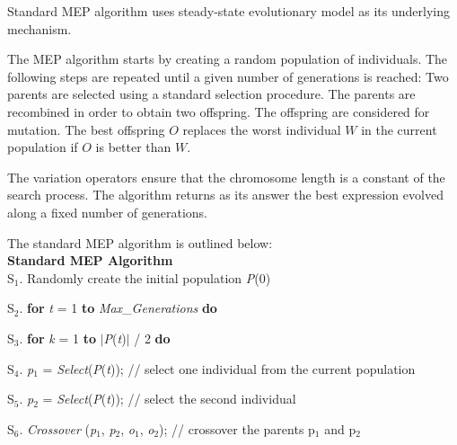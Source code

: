\documentclass [11pt]{article}
\begin{document}
Standard MEP algorithm uses steady-state evolutionary model \cite{syswerda1} as its underlying 
mechanism. 

The MEP algorithm starts by creating a random population of individuals. The 
following steps are repeated until a given number of generations is reached: 
Two parents are selected using a standard selection procedure. The parents 
are recombined in order to obtain two offspring. The offspring are 
considered for mutation. The best offspring $O$ replaces the worst individual 
$W$ in the current population if $O$ is better than $W$. 

The variation operators ensure that the chromosome length is a constant of 
the search process. The algorithm returns as its answer the best expression 
evolved along a fixed number of generations.

The standard MEP algorithm is outlined below:\\

\textbf{Standard MEP Algorithm}\\

\textsf{S}$_{1}$\textsf{. Randomly create the initial population 
}\textsf{\textit{P}}\textsf{(0)}

\textsf{S}$_{2}$\textsf{. }\textsf{\textbf{for}}\textsf{ 
}\textsf{\textit{t}}\textsf{ = 1 }\textsf{\textbf{to}}\textsf{ 
}\textsf{\textit{Max}}\textsf{{\_}}\textsf{\textit{Generations}}\textsf{ 
}\textsf{\textbf{do}}

\textsf{S}$_{3}$\textsf{. }\hspace{0.5cm}\textsf{\textbf{for}}\textsf{ 
}\textsf{\textit{k}}\textsf{ = 1 }\textsf{\textbf{to}}\textsf{ $\vert 
$}\textsf{\textit{P}}\textsf{(}\textsf{\textit{t}}\textsf{)$\vert $ / 2 
}\textsf{\textbf{do}}

\textsf{S}$_{4}$\textsf{. }\hspace{1cm}\textsf{\textit{p}}$_{1}$\textsf{ = 
}\textsf{\textit{Select}}\textsf{(}\textsf{\textit{P}}\textsf{(}\textsf{\textit{t}}\textsf{)); 
// select one individual from the current population}

\textsf{S}$_{5}$\textsf{. }\hspace{1cm}\textsf{\textit{p}}$_{2}$\textsf{ = 
}\textsf{\textit{Select}}\textsf{(}\textsf{\textit{P}}\textsf{(}\textsf{\textit{t}}\textsf{)); 
// select the second individual }

\textsf{S}$_{6}$\textsf{. }\hspace{1cm}\textsf{\textit{Crossover}}\textsf{ 
(}\textsf{\textit{p}}$_{1}$\textsf{, }\textsf{\textit{p}}$_{2}$\textsf{, 
}\textsf{\textit{o}}$_{1}$\textsf{, }\textsf{\textit{o}}$_{2}$\textsf{); // 
crossover the parents p}$_{1}$\textsf{ and p}$_{2}$
\end{document}
